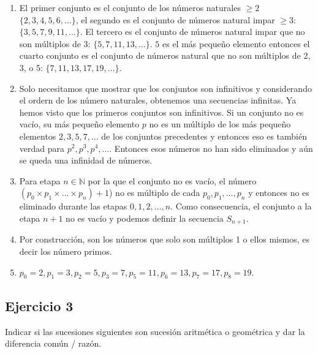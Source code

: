 \begin{enumerate}
\item El primer conjunto es el conjunto de los números naturales $\geq 2$
  $\{ 2, 3, 4, 5, 6, \ldots \}$, el segundo
  es el conjunto de números natural impar $\geq 3$: $\{ 3, 5, 7, 9, 11, \ldots \}$.
  El tercero es el conjunto de números natural impar que no son múltiplos de
  3: $\{ 5, 7, 11, 13, \ldots \}$. $5$ es el más pequeño elemento entonces
  el cuarto conjunto es el conjunto de números natural que no son múltiplos de
  2, 3, o 5: $\{ 7, 11, 13, 17, 19, \ldots \}$.
\item Solo necesitamos que mostrar que los conjuntos son infinitivos y
  considerando el ordern de los número naturales, obtenemos una secuencias
  infinitas. Ya hemos visto que los primeros conjuntos son infinitivos.
  Si un conjunto no es vacío, su más pequeño elemento $p$ no es un múltiplo
  de los más pequeño elementos $2, 3, 5, 7, \ldots$ de los conjuntos precedentes y
  entonces eso es también verdad para $p^2, p^3, p^4, \ldots$. Entonces esos
  números no han sido eliminados y aún se queda una infinidad de números.
\item Para etapa $n \in \mathbb N$ por la que el conjunto no es vacío,
  el número $\left(p_0 \times p_1 \times \ldots \times p_n\right) + 1$)
  no es múltiplo de cada $p_0, p_1, \ldots, p_n$ y entonces no es eliminado durante
  las etapas $0, 1, 2, \ldots, n$. Como consecuencia, el conjunto a la etapa
  $n+1$ no es vacío y podemos definir la secuencia $S_{n+1}$.
\item Por construcción, son los números que solo son múltiplos 1 o ellos mismos,
  es decir los número primos.
\item $p_0=2, p_1=3, p_2=5, p_3=7, p_5=11, p_6=13, p_7=17, p_8=19$.
\end{enumerate}

\subsection*{Ejercicio 3}

Indicar si las sucesiones siguientes son sucesión aritmética o geométrica y
dar la diferencia común / razón.

